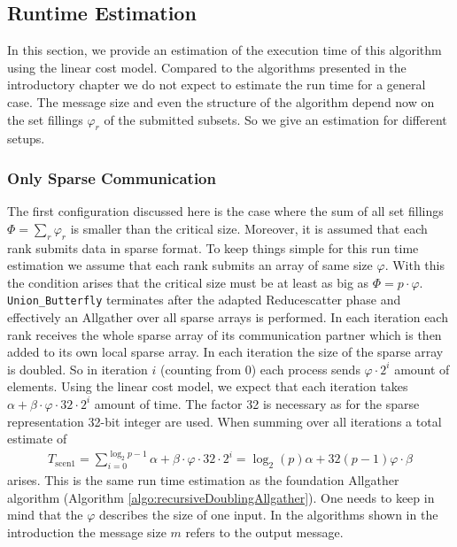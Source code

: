 \subsection{Runtime Estimation}
In this section, we provide an estimation of the execution time of this algorithm using the linear cost model. Compared to the algorithms presented in the introductory chapter we do not expect to estimate the run time for a general case. The message size and even the structure of the algorithm depend now on the set fillings $\varphi_r$ of the submitted subsets. So we give an estimation for different setups.
\subsubsection{Only Sparse Communication} \label{sec:UnionButterflyOnlySparseRuntime}
The first configuration discussed here is the case where the sum of all set fillings $\Phi = \sum_r \varphi_r$ is smaller than the critical size. Moreover, it is assumed that each rank submits data in sparse format. To keep things simple for this run time estimation we assume that each rank submits an array of same size $\varphi$. With this the condition arises that the critical size must be at least as big as $\Phi=p\cdot \varphi$. \texttt{Union\_Butterfly} terminates after the adapted Reducescatter phase and effectively an Allgather over all sparse arrays is performed.
In each iteration each rank receives the whole sparse array of its communication partner which is then added to its own local sparse array. In each iteration the size of the sparse array is doubled. So in iteration $i$ (counting from 0) each process sends $\varphi\cdot 2^i$ amount of elements. Using the linear cost model, we expect that each iteration takes $\alpha + \beta \cdot \varphi \cdot 32 \cdot 2^i$ amount of time. The factor 32 is necessary as for the sparse representation 32-bit integer are used. When summing over all iterations a total estimate of
\begin{align*}
	T_\mathrm{scen1} = \sum_{i=0}^{\log_2{p}-1} \alpha + \beta  \cdot \varphi \cdot 32 \cdot 2^i
	= \log_2(p) \alpha + 32(p-1)\varphi \cdot \beta
\end{align*}  
arises. This is the same run time estimation as the foundation Allgather algorithm (Algorithm \ref{algo:recursiveDoublingAllgather}). One needs to keep in mind that the $\varphi$ describes the size of one input. In the algorithms shown in the introduction the message size $m$ refers to the output message. 


